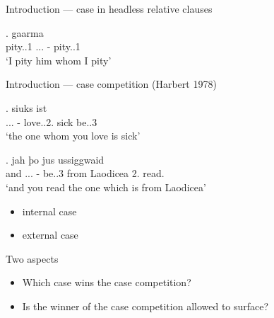 \documentclass[xcolor=dvipsnames,10pt]{beamer}
\begin{document}
\begin{frame}{Introduction --- case in headless relative clauses}

\exg. gaarma   \\
 pity..1\textcolor{LimeGreen}{\scsub{[acc]}} ...\textcolor{LimeGreen}{} - pity..1\textcolor{LimeGreen}{\scsub{[acc]}}\\
 `I pity him whom I pity' 

\end{frame}

\begin{frame}{Introduction --- case competition (Harbert 1978)}

\exg.    siuks ist\\
 ...\textcolor{LimeGreen}{} - love..2.\textcolor{LimeGreen}{\scsub{[acc]}} sick be..3\textcolor{Turquoise}{\scsub{[nom]}}\\
 `the one whom you love is sick' 

\pause

\exg. jah þo     jus ussiggwaid\\
 and ...\textcolor{LimeGreen}{} - be..3\textcolor{Turquoise}{\scsub{[nom]}} from Laodicea 2. read.\textcolor{LimeGreen}{\scsub{[acc]}}\\
 `and you read the one which is from Laodicea' 

 \pause

 \begin{itemize}
   \item internal case
   \item external case
 \end{itemize}


\end{frame}

\begin{frame}{Two aspects}

\begin{itemize}
  \pause\item Which case wins the case competition?
  \pause\item Is the winner of the case competition allowed to surface?
\end{itemize}

\end{frame}
\end{document}
